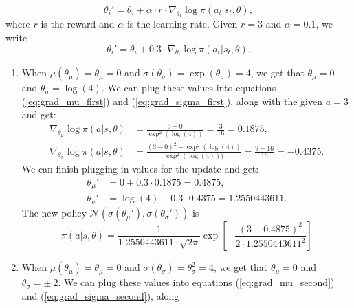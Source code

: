\documentclass{article}
\begin{document}
\begin{enumerate}
	      \begin{equation}
		      \theta_i'=  \theta_i + \alpha \cdot r \cdot \nabla_{\theta_i} \log \pi(a_t|s_t, \theta),
	      \end{equation}
	      where $r$ is the reward and $\alpha$ is the learning rate. Given $r = 3$ and $\alpha = 0.1$,
	      we write
	      \begin{equation}
		      \theta_i'=  \theta_i + 0.3 \cdot \nabla_{\theta_i} \log \pi(a_t|s_t, \theta).
	      \end{equation}
	      \begin{enumerate}
		      \item When $\mu(\theta_\mu) = \theta_\mu = 0$ and $\sigma(\theta_\sigma)
			            = \exp(\theta_\sigma) = 4$, we get that $\theta_\mu = 0$ and $\theta_\sigma
			            = \log(4)$. We can plug these values into equations (\ref{eq:grad_mu_first}) and
		            (\ref{eq:grad_sigma_first}), along with the given $a=3$ and get:
		            \begin{align*}
			            \nabla_{\theta_\mu} \log \pi(a|s, \theta)    & = \frac{3-0}{\exp^2(\log(4))}
			            = \frac{3}{16} = 0.1875,                                                     \\
			            \nabla_{\theta_\sigma} \log \pi(a|s, \theta) & = \frac{
				            (3-0)^2-\exp^2(\log(4)) }{\exp^2(\log(4)))} = \frac{9 - 16}{16} = -0.4375.
		            \end{align*}
		            We can finish plugging in values for the update and get:
		            \begin{align}
			            \theta_\mu'    & =  0 + 0.3 \cdot 0.1875 = 0.4875,             \\
			            \theta_\sigma' & =  \log(4) - 0.3 \cdot 0.4375 = 1.2550443611.
		            \end{align}
		            The new policy $\mathcal{N}(\sigma(\theta_\mu'), \sigma(\theta_\sigma'))$ is
		            \begin{equation}
			            \pi(a|s, \theta) = \frac{1}{1.2550443611 \cdot \sqrt{2 \pi}}\exp\left[-\frac{(3
					            - 0.4875)^2}{2 \cdot 1.2550443611^2}\right]
		            \end{equation}
		      \item When $\mu(\theta_\mu) = \theta_\mu = 0$ and $\sigma(\theta_\sigma) = \theta_\sigma^2
			            = 4$, we get that $\theta_\mu = 0$ and $\theta_\sigma = \pm ~ 2$. We can plug these
		            values into equations (\ref{eq:grad_mu_second}) and (\ref{eq:grad_sigma_second}), along

\end{enumerate}
\end{enumerate}
\end{document}
